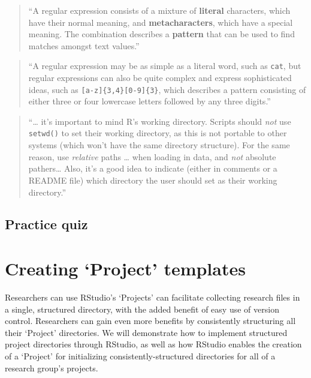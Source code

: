 \documentclass[]{tufte-book}
\begin{document}
\begin{quote}
``A regular expression consists of a mixture of \textbf{literal} characters, which have their
normal meaning, and \textbf{metacharacters}, which have a special meaning. The combination
describes a \textbf{pattern} that can be used to find matches amongst text values.'' \citep{murrell2009introduction}
\end{quote}

\begin{quote}
``A regular expression may be as simple as a literal word, such as \texttt{cat}, but regular
expressions can also be quite complex and express sophisticated ideas, such as
\texttt{{[}a-z{]}\{3,4\}{[}0-9{]}\{3\}}, which describes a pattern consisting of either three or four
lowercase letters followed by any three digits.'' \citep{murrell2009introduction}
\end{quote}

\begin{quote}
``\ldots{} it's important to mind R's working directory. Scripts should \emph{not} use
\texttt{setwd()} to set their working directory, as this is not portable to other
systems (which won't have the same directory structure). For the same reason,
use \emph{relative} paths \ldots{} when loading in data, and \emph{not} absolute pathers\ldots{}
Also, it's a good idea to indicate (either in comments or a README file)
which directory the user should set as their working directory.'' \citep{buffalo2015bioinformatics}
\end{quote}

\hypertarget{practice-quiz}{%
\subsection{Practice quiz}\label{practice-quiz}}

\hypertarget{creating-project-templates}{%
\section{Creating `Project' templates}\label{creating-project-templates}}

Researchers can use RStudio's `Projects' can facilitate collecting research
files in a single, structured directory, with the added benefit of easy use of
version control. Researchers can gain even more benefits by consistently
structuring all their `Project' directories. We will demonstrate how to
implement structured project directories through RStudio, as well as how RStudio
enables the creation of a `Project' for initializing consistently-structured
directories for all of a research group's projects.
\end{document}
